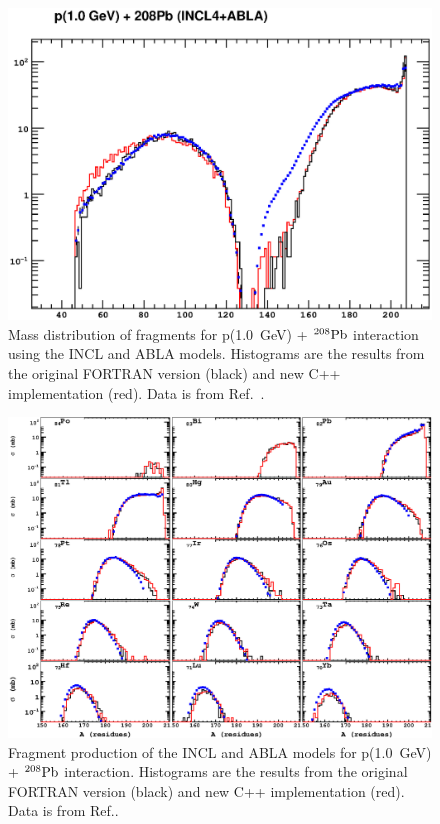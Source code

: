 \documentclass[a4paper]{jpconf}
\begin{document}
\begin{figure}[h]
\begin{center}
\includegraphics[scale=0.80]{poster/images/fragments.eps}

\caption{\label{fig:fragpb}Mass distribution of fragments  for p(1.0~GeV) + $^{208}{\rm Pb}$ interaction 
using the INCL and ABLA  models.
Histograms are the results from the original FORTRAN version (black) 
and new C++ implementation (red). Data is from Ref.~\cite{gsifragments}.}
\end{center}
\end{figure}

\begin{figure}[h]
\begin{center}
\includegraphics[scale=0.80]{poster/images/pPbIsotopes.eps}

\caption{\label{fig:fragisotopes}Fragment production of the INCL and ABLA  models 
for p(1.0~GeV) + $^{208}{\rm Pb}$ interaction. %
Histograms are the results from the original FORTRAN version (black)
and new C++ implementation (red). Data is from Ref.\cite{gsifragments}.}

\end{center}
\end{figure}
\end{document}
